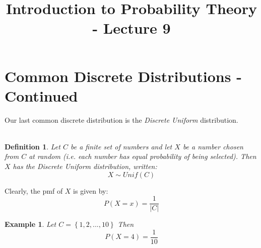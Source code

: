 \documentclass[12pt]{article} %
\title{Introduction to Probability Theory - Lecture 9}
\newtheorem{defn}{Definition}
\newtheorem{example}{Example}
\begin{document}
\maketitle
\section{Common Discrete Distributions - Continued}
Our last common discrete distribution is the \emph{Discrete Uniform} distribution.\\\\
\begin{defn}
Let $C$ be a finite set of numbers and let $X$ be a number chosen from $C$ at random (i.e. each number has equal probability of being selected). Then $X$ has the \emph{Discrete Uniform} distribution, written:
$$X\sim Unif(C)$$
\end{defn}
Clearly, the pmf of $X$ is given by:
$$P(X=x) = \frac1{|C|}$$
\begin{example}
Let $C =\left\{1,2,...,10\right\}$ Then
$$P(X=4) = \frac1{10}$$
\end{example}
\end{document}
